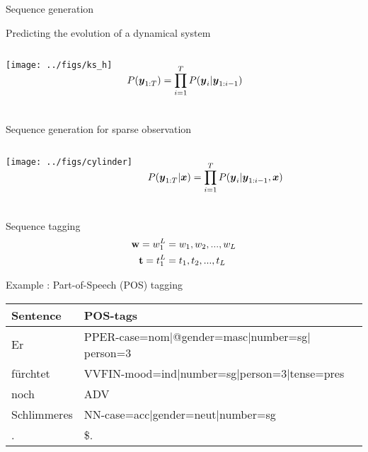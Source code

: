 \begin{frame}{Sequence generation}
  \begin{block}{Predicting the evolution of a dynamical system}
    \begin{columns}
      \begin{center}
        \texttt{[image: ../figs/ks\_h]}
      \end{center}
      $$P(\boldsymbol{y}_{1:T}) = \prod_{i=1}^{T} P(\boldsymbol{y}_i | \boldsymbol{y}_{1:i-1})$$
    \end{columns}
  \end{block}
  \begin{block}{Sequence generation for sparse observation}
    \begin{columns}
      \begin{center}
        \texttt{[image: ../figs/cylinder]}
      \end{center}
      $$P(\boldsymbol{y}_{1:T}| \boldsymbol{x} ) = \prod_{i=1}^{T} P(\boldsymbol{y}_i | \boldsymbol{y}_{1:i-1}, \boldsymbol{x})$$
    \end{columns}
  \end{block}
\end{frame}


\begin{frame}{Sequence tagging}
  \begin{align*}
   {\mathbf{{w}}} = {w}_{1}^{{L}} &= {w}_1, {w}_2, ..., {w}_{{L}}\\
   \mathbf{t} = t_{1}^{{L}} &= t_1, t_2, ..., t_{{L}}
  \end{align*}

  Example : Part-of-Speech (POS) tagging\\
  
  \begin{center}
    \begin{tabular}{l|l}
      Sentence &POS-tags\\\hline
      Er &PPER-case=nom$|$@gender=masc$|$number=sg$|$person=3\\
      fürchtet  &VVFIN-mood=ind$|$number=sg$|$person=3$|$tense=pres \\
      noch &ADV \\
      Schlimmeres &NN-case=acc$|$gender=neut$|$number=sg\\
      . &\$. 
    \end{tabular}
  \end{center}
\end{frame}


